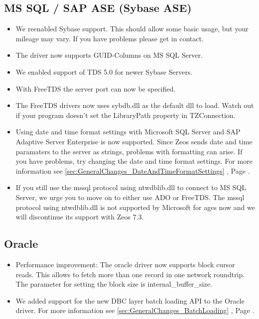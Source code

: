 \documentclass[a4paper,12pt,oneside]{article}
\begin{document}
\subsection{MS SQL / SAP ASE (Sybase ASE)}
\label{sec:DriverSpecificChanges_MssqlAse}
\begin{itemize}
\item 
  We reenabled Sybase support.
	This should allow some basic usage, but your mileage may vary.
	If you have problems please get in contact.
\item 
  The driver now supports GUID-Columns on MS SQL Server.
\item 
  We enabled support of TDS 5.0 for newer Sybase Servers.
\item 
  With FreeTDS the server port can now be specified.
\item 
  The FreeTDS drivers now uses sybdb.dll as the default dll to load.
	Watch out if your program doesn't set the LibraryPath property in TZConnection.
\item
  Using date and time format settings with Microsoft SQL Server and SAP Adaptive Server Enterprise is now supported.
  Since Zeos sends date and time paramaters to the server as strings, problems with formatting can arise.
	If you have problems, try changing the date and time format settings.
	For more information see \ref{sec:GeneralChanges_DateAndTimeFormatSettings} , Page \pageref{sec:GeneralChanges_DateAndTimeFormatSettings}.
\item 
  If you still use the mssql protocol using ntwdblib.dll to connect to MS SQL Server, we urge you to move on to either use ADO or FreeTDS.
	The mssql protocol using ntwdblib.dll is not supported by Microsoft for ages now and we will discontinue its support with Zeos 7.3.
\end{itemize}

\subsection{Oracle}
\label{sec:DriverSpecificChanges_Oracle}
\begin{itemize}
\item
  Performance improvement: The oracle driver now supports block cursor reads.
	This allows to fetch more than one record in one network roundtrip.
	The parameter for setting the block size is internal\_buffer\_size.
\item
  We added support for the new DBC layer batch loading API to the Oracle driver.
	For more information see \ref{sec:GeneralChanges_BatchLoading} , Page \pageref{sec:GeneralChanges_BatchLoading}.
\end{itemize}
\end{document}
